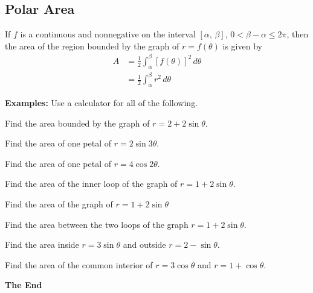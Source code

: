 \subsection*{Polar Area}
\begin{tcolorbox}[title= AREA IN POLAR FORM ,colframe=black,sharp corners,colback=white,colbacktitle=white,coltitle=black]

    If $f$ is a continuous and nonnegative on the interval $[\alpha,\,\beta]$, $0<\beta-\alpha\le2\pi$, then the area of the region bounded by the graph of $r=f(\theta)$ is given by
    \begin{align*}
        A   &= \frac{1}{2}\int_\alpha^\beta[f(\theta)]^2\,d\theta\\
            &= \frac{1}{2}\int_\alpha^\beta r^2\,d\theta
    \end{align*}
    
\end{tcolorbox}
\vspace{.1cm}
\noindent\textbf{Examples:} Use a calculator for all of the following.
\begin{questions}
    \question Find the area bounded by the graph of $r=2+2\sin\theta.$
    
    \question Find the area of one petal of $r=2\sin3\theta$.
    
    \question Find the area of one petal of $r=4\cos2\theta$.
    
    \newpage
    
    \question Find the area of the inner loop of the graph of $r=1+2\sin\theta$.
    
    \question Find the area of the graph of $r=1+2\sin\theta$
    
    \question Find the area between the two loops of the graph $r=1+2\sin\theta$.
    
    \newpage
    
    \question Find the area inside $r=3\sin\theta$ and outside $r=2-\sin\theta$.
    
    \question Find the area of the common interior of $r=3\cos\theta$ and $r=1+\cos\theta$.
\end{questions}

\newpage

\hspace{0pt}
\vfill
\begin{center}
    \textbf{The End}
\end{center}
\vfill
\hspace{0pt}


\newpage





